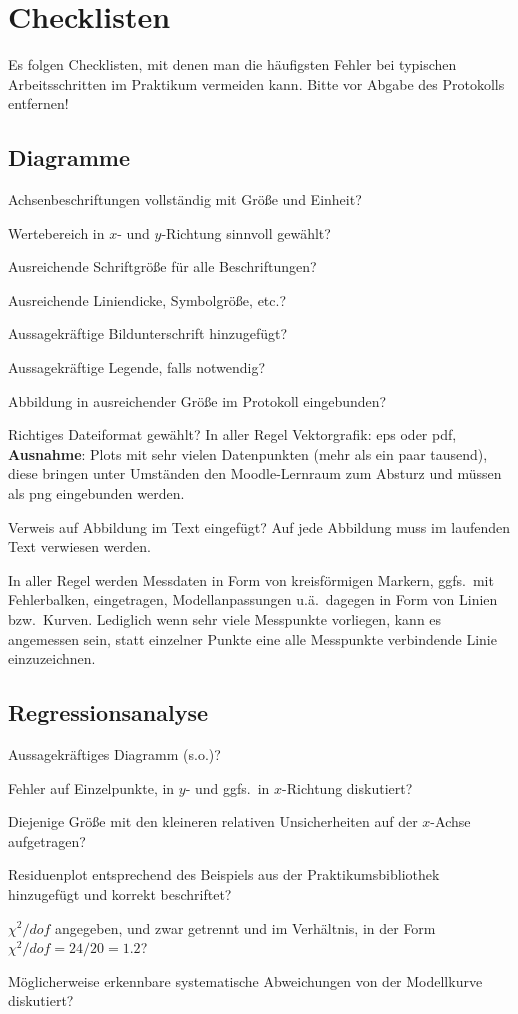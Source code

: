 \documentclass[twoside]{protokoll}
\begin{document}
\section*{Checklisten}
Es folgen Checklisten, mit denen man die häufigsten Fehler bei
typischen Arbeitsschritten im Praktikum vermeiden kann. Bitte vor
Abgabe des Protokolls entfernen!

\subsection*{Diagramme}
\begin{checklist}
\item Achsenbeschriftungen vollständig mit Größe und Einheit?
\item Wertebereich in $x$- und $y$-Richtung sinnvoll gewählt?
\item Ausreichende Schriftgröße für alle Beschriftungen?
\item Ausreichende Liniendicke, Symbolgröße, etc.?
\item Aussagekräftige Bildunterschrift hinzugefügt?
\item Aussagekräftige Legende, falls notwendig?
\item Abbildung in ausreichender Größe im Protokoll eingebunden?
\item Richtiges Dateiformat gewählt? In aller Regel Vektorgrafik: eps
  oder pdf, \textbf{Ausnahme}: Plots mit sehr vielen Datenpunkten
  (mehr als ein paar tausend), diese bringen unter Umständen den
  Moodle-Lernraum zum Absturz und müssen als png eingebunden werden.
\item Verweis auf Abbildung im Text eingefügt? Auf jede Abbildung muss
  im laufenden Text verwiesen werden.
\end{checklist}

\noindent In aller Regel werden Messdaten in Form von kreisförmigen Markern,
ggfs.~mit Fehlerbalken, eingetragen, Modellanpassungen u.ä.~dagegen in
Form von Linien bzw.~Kurven. Lediglich wenn sehr viele Messpunkte
vorliegen, kann es angemessen sein, statt einzelner Punkte eine alle
Messpunkte verbindende Linie einzuzeichnen.

\subsection*{Regressionsanalyse}
\begin{checklist}
\item Aussagekräftiges Diagramm (s.o.)?
\item Fehler auf Einzelpunkte, in $y$- und ggfs.~in $x$-Richtung
  diskutiert?
\item Diejenige Größe mit den kleineren relativen Unsicherheiten auf
  der $x$-Achse aufgetragen?
\item Residuenplot entsprechend des Beispiels aus der
  Praktikumsbibliothek hinzugefügt und korrekt beschriftet?
\item $\chi^2/dof$ angegeben, und zwar getrennt und im Verhältnis, in
  der Form $\chi^2/dof=24/20=1.2$?
\item Möglicherweise erkennbare systematische Abweichungen von der
  Modellkurve diskutiert?
\end{checklist}
\end{document}
